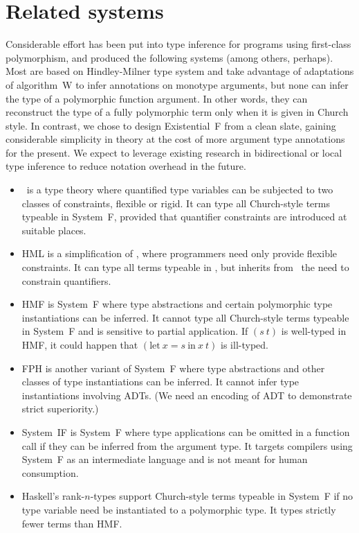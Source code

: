 \documentclass{amsart}
\begin{document}
\section{Related systems}

\nc{}

Considerable effort has been put into type inference for programs
using first-class polymorphism, and produced the following
systems (among others, perhaps). Most are based on Hindley-Milner
type system and take advantage of adaptations of algorithm~W to
infer annotations on monotype arguments, but none can infer the
type of a polymorphic function argument. In other words, they can
reconstruct the type of a fully polymorphic term only when it is
given in Church style. In contrast, we chose to design
Existential~F from a clean slate, gaining considerable simplicity
in theory at the cost of more argument type annotations for the
present. We expect to leverage existing research in bidirectional
or local type inference to reduce notation overhead in the
future.
\begin{itemize}
\item \MLF\ is a type theory where quantified type variables can
be subjected to two classes of constraints, flexible or rigid. It
can type all Church-style terms typeable in System~F, provided
that quantifier constraints are introduced at suitable places.

\item HML is a simplification of \MLF, where programmers need
only provide flexible constraints. It can type all terms typeable
in \MLF, but inherits from \MLF\ the need to constrain
quantifiers.

\item HMF is System~F where type abstractions and certain
polymorphic type instantiations can be inferred. It cannot type
all Church-style terms typeable in System~F and is sensitive to
partial application. If $(s~t)$ is well-typed in HMF, it could
happen that $(\mathrm{let}~x=s~\mathrm{in}~x~t)$ is ill-typed.


\item FPH is another variant of System~F where type abstractions
and other classes of type instantiations can be inferred. It
cannot infer type instantiations involving ADTs. (We need an
encoding of ADT to demonstrate strict superiority.)

\item System~IF is System~F where type applications can be
omitted in a function call if they can be inferred from the
argument type. It targets compilers using System~F as an
intermediate language and is not meant for human consumption.

\item Haskell's rank-$n$-types support Church-style terms
typeable in System~F if no type variable need be instantiated to
a polymorphic type. It types strictly fewer terms than HMF.
\end{itemize}
\end{document}
